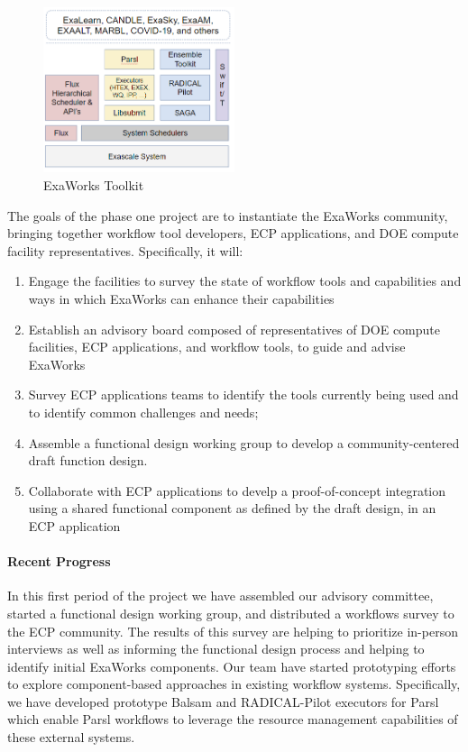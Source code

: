 \begin{figure}
\begin{center}
    \includegraphics[width=0.5\textwidth]{projects/2.3.5-Ecosystem/2.3.5.10-ExaWorks/exaworks.png}
  \end{center}
  \caption{ExaWorks Toolkit\label{fig:arch}}
\end{figure} 

The goals of the phase one project are to instantiate the ExaWorks community, 
bringing together workflow tool developers, ECP applications, and DOE compute facility representatives.  Specifically, it will:
\begin{enumerate}
    \item Engage the facilities to survey the state of workflow tools and capabilities and ways in which ExaWorks can enhance their capabilities
    \item Establish an advisory board composed of representatives of DOE compute facilities, ECP applications, and workflow tools, to guide and advise ExaWorks
    \item Survey ECP applications teams to identify the tools currently being used and to identify common challenges and needs;
    \item Assemble a functional design working group to develop a community-centered draft function design.
    \item Collaborate with ECP applications to develp a proof-of-concept integration using a shared functional component as defined by the draft design, in an ECP application
\end{enumerate}

\paragraph{Recent Progress}
In this first period of the project we have
assembled our advisory committee, 
started a functional design working group, and distributed a workflows
survey to the ECP community. The results of this survey are helping
to prioritize in-person interviews as well as informing the 
functional design process and helping to identify initial ExaWorks components. 
Our team have started prototyping efforts to explore 
component-based approaches in existing workflow systems. Specifically, 
we have developed prototype Balsam and RADICAL-Pilot executors for Parsl
which enable Parsl workflows to leverage the resource management 
capabilities of these external systems.


